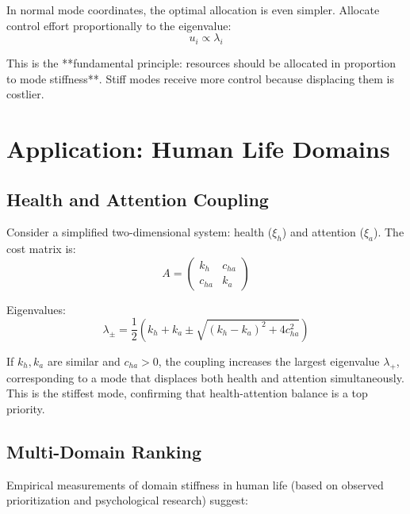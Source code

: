 \documentclass[12pt]{article}
\begin{document}
In normal mode coordinates, the optimal allocation is even simpler. Allocate control effort proportionally to the eigenvalue:
\begin{equation}
u_i \propto \lambda_i
\end{equation}

This is the **fundamental principle: resources should be allocated in proportion to mode stiffness**. Stiff modes receive more control because displacing them is costlier.

\section{Application: Human Life Domains}

\subsection{Health and Attention Coupling}

Consider a simplified two-dimensional system: health ($\xi_h$) and attention ($\xi_a$). The cost matrix is:
\begin{equation}
A = \begin{pmatrix} k_h & c_{ha} \\ c_{ha} & k_a \end{pmatrix}
\end{equation}

Eigenvalues:
\begin{equation}
\lambda_\pm = \frac{1}{2} \left( k_h + k_a \pm \sqrt{(k_h - k_a)^2 + 4c_{ha}^2} \right)
\end{equation}

If $k_h, k_a$ are similar and $c_{ha} > 0$, the coupling increases the largest eigenvalue $\lambda_+$, corresponding to a mode that displaces both health and attention simultaneously. This is the stiffest mode, confirming that health-attention balance is a top priority.

\subsection{Multi-Domain Ranking}

Empirical measurements of domain stiffness in human life (based on observed prioritization and psychological research) suggest:
\end{document}
